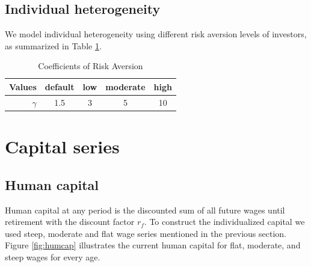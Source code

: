 \subsection{Individual heterogeneity}

We model individual heterogeneity using different risk aversion levels of investors, as summarized in Table \ref{table:riskave}.

\begin{table}[h!]
	\centering
	\caption{Coefficients of Risk Aversion}
	\label{table:riskave}
	\begin{tabular}[c]{r|cccc}
		Values&default&low&moderate&high\\
		\hline
		$\gamma$&1.5&3&5&10\\
	\end{tabular}
\end{table}

\section{Capital series}

\subsection{Human capital}
Human capital at any period is the discounted sum of all future wages until retirement with the discount factor $r_f$. To construct the individualized capital we used steep, moderate and flat wage series mentioned in the previous section. Figure \ref{fig:humcap} illustrates the current human capital for flat, moderate, and steep wages for every age. 

